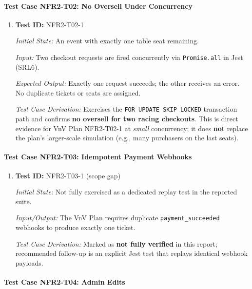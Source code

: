 \documentclass[12pt, titlepage]{article}
\begin{document}
\paragraph{Test Case NFR2-T02: No Oversell Under Concurrency}

\begin{enumerate}

\item \textbf{Test ID:} NFR2-T02-1

\textit{Initial State:} An event with exactly one table seat remaining.

\textit{Input:} Two checkout requests are fired concurrently via \texttt{Promise.all} in Jest (SRL6).

\textit{Expected Output:} Exactly one request succeeds; the other receives an error. No duplicate tickets or seats are assigned.

\textit{Test Case Derivation:} Exercises the \texttt{FOR UPDATE SKIP LOCKED} transaction path and confirms \textbf{no oversell for two racing checkouts}. This is direct evidence for VnV Plan NFR2-T02-1 at \emph{small} concurrency; it does \textbf{not} replace the plan's larger-scale simulation (e.g., many purchasers on the last seats).

\end{enumerate}


\paragraph{Test Case NFR2-T03: Idempotent Payment Webhooks}

\begin{enumerate}

\item \textbf{Test ID:} NFR2-T03-1 (scope gap)

\textit{Initial State:} Not fully exercised as a dedicated replay test in the reported suite.

\textit{Input/Output:} The VnV Plan requires duplicate \texttt{payment\_succeeded} webhooks to produce exactly one ticket.

\textit{Test Case Derivation:} Marked as \textbf{not fully verified} in this report; recommended follow-up is an explicit Jest test that replays identical webhook payloads.

\end{enumerate}


\paragraph{Test Case NFR2-T04: Admin Edits}
\end{document}
